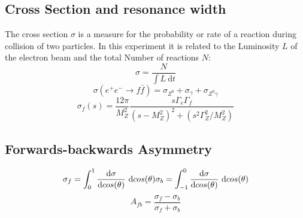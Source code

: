 \subsection{Cross Section and resonance width}
The cross section $\sigma$ is a measure for the probability or rate of a reaction during collision of two particles. In this experiment it is related to the Luminosity $L$ of the electron beam and the total Number of reactions $N$:
\begin{equation}
\sigma = \frac{N}{\int L~\text{d}t}
\end{equation}
\begin{equation}
\sigma(e^+e^- \rightarrow f\bar{f})=\sigma_{Z^0}+\sigma_\gamma+\sigma_{Z^0\gamma}
\end{equation}
\begin{equation}
\sigma_f(s) = \frac{12\pi}{M_Z^2} \frac{s\Gamma_e\Gamma_f}{(s-M_Z^2)^2+(s^2\Gamma_Z^2/M_Z^2)}
\end{equation}


\subsection{Forwards-backwards Asymmetry}
\begin{equation}
\sigma_f=\int_{0}^{1}\frac{\text{d}\sigma}{\text{d}cos(\theta)}~\text{d}cos(\theta) \\
\sigma_b=\int_{-1}^{0}\frac{\text{d}\sigma}{\text{d}cos(\theta)}~\text{d}cos(\theta)
\end{equation}
\begin{equation}
A_{fb}=\frac{\sigma_f-\sigma_b}{\sigma_f+\sigma_b}
\end{equation}
